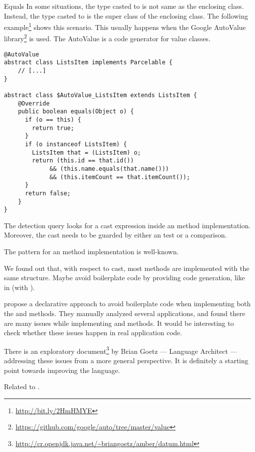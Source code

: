 \begin{pattern}{Equals}
In some situations, the type casted to is not same as the enclosing class.
Instead, the type casted to is the super class of the enclosing class.
The following example\footnote{\url{http://bit.ly/2HmHMYE}} shows this scenario.
This usually happens when the Google AutoValue library\footnote{\url{https://github.com/google/auto/tree/master/value}} is used.
The AutoValue is a code generator for value classes.

\begin{verbatim}
@AutoValue
abstract class ListsItem implements Parcelable {
    // [...]
}

abstract class $AutoValue_ListsItem extends ListsItem {
    @Override
    public boolean equals(Object o) {
      if (o == this) {
        return true;
      }
      if (o instanceof ListsItem) {
        ListsItem that = (ListsItem) o;
        return (this.id == that.id())
             && (this.name.equals(that.name()))
             && (this.itemCount == that.itemCount());
      }
      return false;
    }
}
\end{verbatim}

\detection{}
The detection query looks for a cast expression inside an  method implementation.
Moreover, the cast needs to be guarded by either an  test or a  comparison.

\discussion{}
The pattern for an  method implementation is well-known.


We found out that, with respect to cast,
most  methods are implemented with the same structure.
Maybe avoid boilerplate code by providing code generation,
like in \haskell{} (with ).

\cite{vaziriDeclarativeObjectIdentity2007} propose a declarative approach to avoid boilerplate code when implementing both the  and  methods.
They manually analyzed several applications, and found there are many issues while implementing  and  methods.
It would be interesting to check whether these issues happen in real application code.

There is an exploratory document\footnote{\url{http://cr.openjdk.java.net/\~briangoetz/amber/datum.html}}
by Brian Goetz --- \java{} Language Architect ---
addressing these issues from a more general perspective.
It is definitely a starting point towards improving the \java{} language.

\related{}
Related to .
\end{pattern}